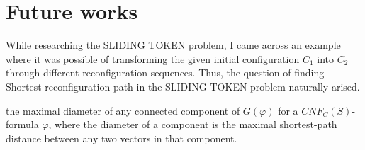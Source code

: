 \chapter{Future works}
While researching the SLIDING TOKEN problem, I came across an example where it was possible of
transforming the given initial configuration $C_1$ into $C_2$ through different reconfiguration sequences.
Thus, the question of finding Shortest reconfiguration path in the SLIDING TOKEN problem naturally arised.

the maximal diameter of any connected component of $G(\varphi)$ for a $CNF_C(S)$-
formula $\varphi$, where the diameter of a component is the maximal shortest-path
distance between any two vectors in that component.


